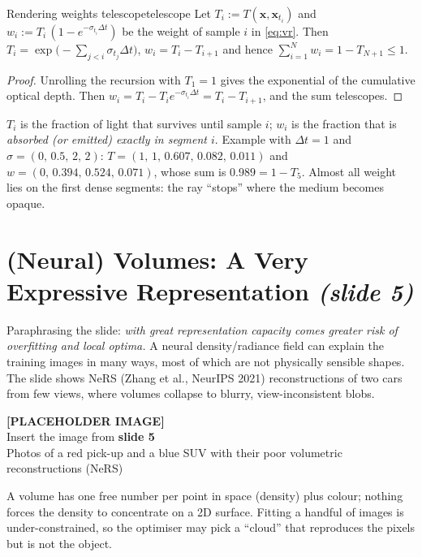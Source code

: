 \documentclass[11pt,a4paper]{article}
\newcommand{\bx}{{\bm{x}}}
\newcommand{\slideimg}[2]{%
  \begin{center}
  \begin{tcolorbox}[enhanced,colback=gray!8,colframe=gray!8,width=0.92\linewidth,
    halign=center,valign=center,height=3.4cm,
    overlay={\draw[dashed,gray!70,thick] (frame.south west) rectangle (frame.north east);}]
  \textbf{[PLACEHOLDER IMAGE]}\\ Insert the image from \textbf{#1}\\ {\small #2}
  \end{tcolorbox}
  \end{center}}
\begin{document}
\begin{Lemma}{Rendering weights telescope}{telescope}
Let $T_i:=T(\bx,\bx_{t_i})$ and $w_i:=T_i\,(1-e^{-\sigma_{t_i}\Delta t})$ be the weight of sample $i$ in \eqref{eq:vr}.
Then $T_i=\exp\!\bigl(-\sum_{j<i}\sigma_{t_j}\Delta t\bigr)$, $w_i=T_i-T_{i+1}$ and hence
$\sum_{i=1}^N w_i = 1-T_{N+1}\le 1.$
\end{Lemma}
\begin{proof}
Unrolling the recursion with $T_1=1$ gives the exponential of the cumulative optical depth.
Then $w_i=T_i-T_i e^{-\sigma_{t_i}\Delta t}=T_i-T_{i+1}$, and the sum telescopes.
\end{proof}
\begin{intuition}
$T_i$ is the fraction of light that survives until sample $i$; $w_i$ is the fraction that is \emph{absorbed (or emitted)
exactly in segment $i$}. Example with $\Delta t=1$ and $\sigma=(0,\,0.5,\,2,\,2)$: $T=(1,\,1,\,0.607,\,0.082,\,0.011)$ and
$w=(0,\,0.394,\,0.524,\,0.071)$, whose sum is $0.989=1-T_5$. Almost all weight lies on the first dense segments:
the ray ``stops'' where the medium becomes opaque.
\end{intuition}

\section{(Neural) Volumes: A Very Expressive Representation \emph{(slide 5)}}
Paraphrasing the slide: \emph{with great representation capacity comes greater risk of overfitting and local optima.}
A neural density/radiance field can explain the training images in many ways, most of which are not physically
sensible shapes. The slide shows NeRS (Zhang et al., NeurIPS 2021) reconstructions of two cars from few views, where
volumes collapse to blurry, view-inconsistent blobs.

\slideimg{slide 5}{Photos of a red pick-up and a blue SUV with their poor volumetric reconstructions (NeRS)}

\begin{intuition}
A volume has one free number per point in space (density) plus colour; nothing forces the density to concentrate on a
2D surface. Fitting a handful of images is under-constrained, so the optimiser may pick a ``cloud'' that reproduces
the pixels but is not the object.
\end{intuition}
\end{document}
